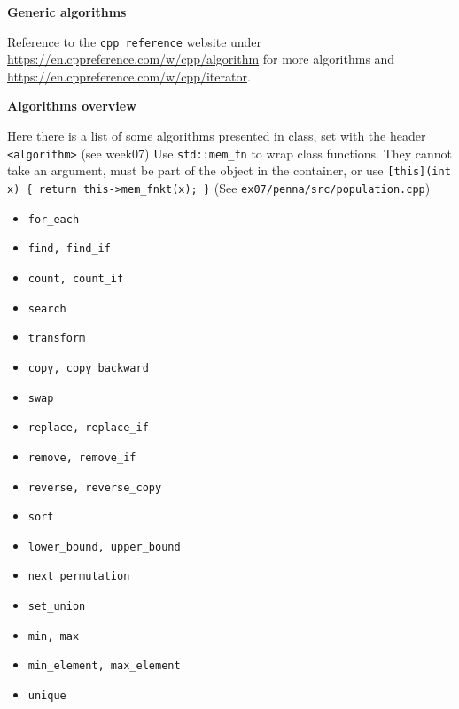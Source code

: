 \documentclass[fontsize=8pt, a4paper, landscape, fleqn]{scrartcl}
\renewcommand{\subsection}[1]{%
    \noindent\colorbox{subsectioncolor}{%
        \parbox{\dimexpr\columnwidth-2\fboxsep}{\color{white}\textbf{#1}}}%
    \vspace{0.5mm}%
}
\begin{document}
\begin{multicols*}{3}[\raggedcolumns]
	\subsection{Generic algorithms}
    Reference to the \lstinline{cpp reference} website under \href{https://en.cppreference.com/w/cpp/algorithm}{https://en.cppreference.com/w/cpp/algorithm} for more algorithms and \href{https://en.cppreference.com/w/cpp/iterator}{https://en.cppreference.com/w/cpp/iterator}.
	\subsection{Algorithms overview}
     Here there is a list of some algorithms presented in class, set with the header \lstinline{<algorithm>} (see week07)
     Use \lstinline{std::mem_fn} to wrap class functions. They cannot take an argument, must be part of the object in the container, or use \texttt{[this](int x) \{ return this->mem\_fnkt(x); \}} (See \lstinline{ex07/penna/src/population.cpp})

    \begin{multicols}{3}
    \begin{itemize}
        \item \lstinline{for_each}  
        \item \lstinline{find, find_if}
        \item \lstinline{count, count_if}  
        \item \lstinline{search}  
        \item \lstinline{transform}  
        \item \lstinline{copy, copy_backward}  
        \item \lstinline{swap}  
        \item \lstinline{replace, replace_if}  
        \item \lstinline{remove, remove_if}  
        \item \lstinline{reverse, reverse_copy}  
        \item \lstinline{sort}  
        \item \lstinline{lower_bound, upper_bound}  
        \item \lstinline{next_permutation}  
        \item \lstinline{set_union}  
        \item \lstinline{min, max}  
        \item \lstinline{min_element, max_element}  
        \item \lstinline{unique}  
    \end{itemize}
    \end{multicols}

\end{multicols*}
\end{document}
